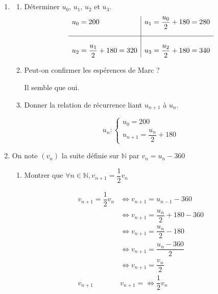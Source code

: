 \documentclass[10pt]{scrartcl}
\begin{document}
\begin{enumerate}[label=\textbf{\arabic*{}.}]
    \item\subsection*{}

    \begin{enumerate}[label=\textbf{\alph*{})}]
        \item Déterminer $u_0$, $u_1$, $u_2$ et $u_3$.
        $$
            \begin{array}{l|l}
                u_0 = 200 & u_1=\dfrac{u_0}{2} + 180 = 280\\[3ex]
                \hline\\
                u_2 = \dfrac{u_1}{2} + 180 = 320 & u_3 = \dfrac{u_2}{2} + 180 = 340
            \end{array}
        $$

        \item Peut-on confirmer les espérences de Marc ?

        \begin{center}
            Il semble que oui.
        \end{center}

        \item Donner la relation de récurrence liant $u_{n+1}$ à $u_n$.

        $$
            u_n : 
            \left\{
            \begin{array}
                {l}u_0 = 200 \\ u_{n+1} = \dfrac{u_n}{2} + 180
            \end{array}
            \right.
        $$
    \end{enumerate}

    \item On note $(v_n)$ la suite définie sur $\mathbb{N}$ par $v_n=u_n - 360$

    \begin{enumerate}[label=\textbf{\alph*)}]
        \item Montrer que $\forall n\in\mathbb{N}, v_{n+1} = \dfrac{1}{2}v_n$

        $$
            \begin{array}{rl}
                v_{n+1} = \dfrac{1}{2}v_n & \iff{} v_{n+1} = u_{n-1} - 360\\[3ex]
                 & \iff{} v_{n+1} = \dfrac{u_n}{2}+180-360\\[3ex]
                 & \iff{} v_{n+1} = \dfrac{u_n}{2} - 180\\[3ex]
                 & \iff{} v_{n+1} = \dfrac{u_n - 360}{2}\\[3ex]
                 & \iff{} v_{n+1} = \dfrac{v_n}{2}\\[3ex]
                v_{n+1} & v_{n+1} = \iff{} \dfrac{1}{2}v_n\\
            \end{array}
        $$
        


\end{enumerate}
\end{enumerate}
\end{document}
